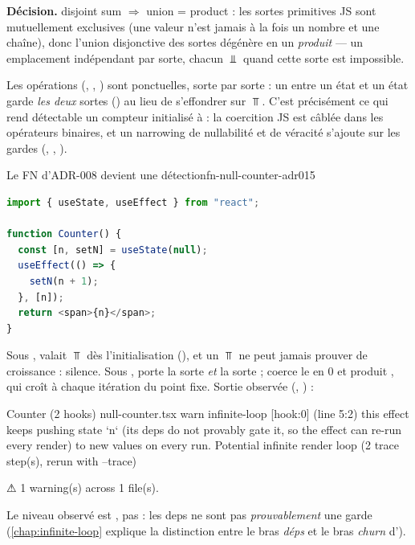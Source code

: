 \textbf{Décision.} \og disjoint sum $\Rightarrow$ union = product\fg{} : les
sortes primitives JS sont mutuellement exclusives (une valeur n'est jamais à
la fois un nombre et une chaîne), donc l'union disjonctive des sortes dégénère
en un \emph{produit} --- un emplacement indépendant par sorte, chacun $\Bot$
quand cette sorte est impossible.


Les opérations (, , ) sont ponctuelles,
sorte par sorte : un  entre un état  et un état
 garde \emph{les deux} sortes () au lieu de
s'effondrer sur $\Top$. C'est précisément ce qui rend détectable un compteur
initialisé à  : la coercition JS  est
câblée dans les opérateurs binaires, et un narrowing de nullabilité et de
véracité s'ajoute sur les gardes (, , ).

\begin{exemple}{Le FN d'ADR-008 devient une détection}{fn-null-counter-adr015}
\begin{lstlisting}[language=TypeScript,caption={Compteur initialisé à \code{null}},label={lst:null-counter-adr015}]
import { useState, useEffect } from "react";

function Counter() {
  const [n, setN] = useState(null);
  useEffect(() => {
    setN(n + 1);
  }, [n]);
  return <span>{n}</span>;
}
\end{lstlisting}
Sous ,  valait $\Top$ dès l'initialisation (),
et un $\Top$ ne peut jamais prouver de croissance : silence. Sous ,
 porte la sorte  \emph{et} la sorte  ;
 coerce le  en $0$ et produit , qui
croît à chaque itération du point fixe. Sortie observée (,
\code{\snapshotCommit}) :
\begin{sortie}
  Counter  (2 hooks)  null-counter.tsx
    warn   infinite-loop  [hook:0]  (line 5:2)  this effect keeps pushing state `n` (its deps do not provably gate it, so the effect can re-run every render) to new values on every run. Potential infinite render loop
       (2 trace step(s), rerun with --trace)

⚠  1 warning(s) across 1 file(s).
\end{sortie}
Le niveau observé est \Warning{}, pas \Error{} : les deps \code{[n]} ne sont
pas \emph{prouvablement} une garde (\cref{chap:infinite-loop} explique la
distinction entre le bras \emph{déps} et le bras \emph{churn} d').
\end{exemple}

